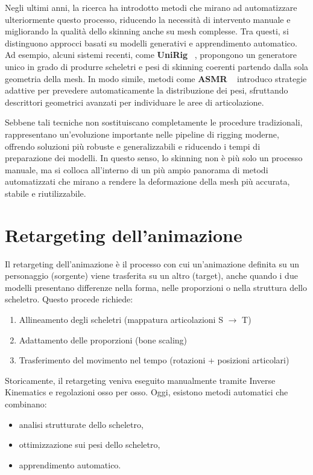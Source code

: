 \begin{itemize}
Negli ultimi anni, la ricerca ha introdotto metodi che mirano ad automatizzare ulteriormente questo processo, riducendo la necessità di intervento manuale e migliorando la qualità dello skinning anche su mesh complesse. Tra questi, si distinguono approcci basati su modelli generativi e apprendimento automatico. Ad esempio, alcuni sistemi recenti, come \textbf{UniRig} ~\cite{uni}, propongono un generatore unico in grado di produrre scheletri e pesi di skinning coerenti partendo dalla sola geometria della mesh. In modo simile, metodi come \textbf{ASMR} ~\cite{asmr} introduco strategie adattive per prevedere automaticamente la distribuzione dei pesi, sfruttando descrittori geometrici avanzati per individuare le aree di articolazione.

Sebbene tali tecniche non sostituiscano completamente le procedure tradizionali, rappresentano un'evoluzione importante nelle pipeline di rigging moderne, offrendo soluzioni più robuste e generalizzabili e riducendo i tempi di preparazione dei modelli. In questo senso, lo skinning non è più solo un processo manuale, ma si colloca all'interno di un più ampio panorama di metodi automatizzati che mirano a rendere la deformazione della mesh più accurata, stabile e riutilizzabile.


\section{Retargeting dell'animazione}

Il retargeting dell'animazione è il processo con cui un'animazione definita su un personaggio (sorgente) viene trasferita su un altro (target), anche quando i due modelli presentano differenze nella forma, nelle proporzioni o nella struttura dello scheletro.
Questo procede richiede: 

\begin{enumerate}
    \item Allineamento degli scheletri (mappatura articolazioni S $\rightarrow$ T)
    \item Adattamento delle proporzioni (bone scaling)
    \item Trasferimento del movimento nel tempo (rotazioni + posizioni articolari)
\end{enumerate}

Storicamente, il retargeting veniva eseguito manualmente tramite Inverse Kinematics e regolazioni osso per osso.
Oggi, esistono metodi automatici che combinano:
\begin{itemize}
    \item analisi strutturate dello scheletro,
    \item ottimizzazione sui pesi dello scheletro,
    \item apprendimento automatico.
\end{itemize}


\end{itemize}
